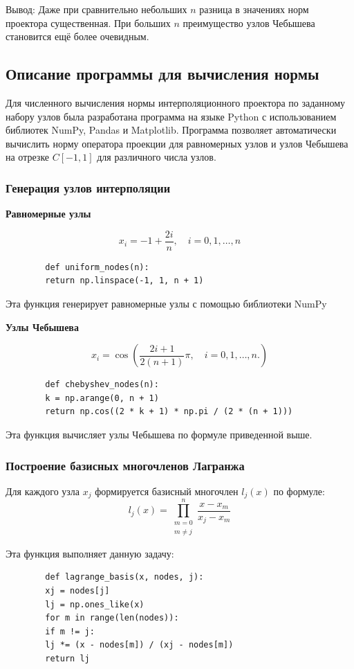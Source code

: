 \documentclass[14pt,openany,a4paper,oneside]{extarticle}
\begin{document}
	Вывод:
	Даже при сравнительно небольших $n$ разница в значениях норм проектора существенная. При больших $n$ преимущество узлов Чебышева становится ещё более очевидным.
	\newpage
	\subsection{Описание программы для вычисления нормы}
	
	Для численного вычисления нормы интерполяционного проектора по заданному набору узлов была разработана программа на языке Python с использованием библиотек NumPy, Pandas и Matplotlib. Программа позволяет автоматически вычислить норму оператора проекции для равномерных узлов и узлов Чебышева на отрезке $C[-1,1]$ для различного числа узлов.
	
	\subsubsection{Генерация узлов интерполяции}
	
	\textbf{Равномерные узлы} 
	
	$$x_i=-1+\frac{2i}{n}, \quad i=0,1,\dots,n$$
	\begin{verbatim}
		def uniform_nodes(n):
		return np.linspace(-1, 1, n + 1)
	\end{verbatim}
	Эта функция генерирует равномерные узлы с помощью библиотеки NumPy 
	
	\textbf{Узлы Чебышева} 
	
	$$x_i = \cos(\frac{2i+1}{2(n+1)}\pi, \quad i=0,1,\dots,n.)$$
	\begin{verbatim}
		def chebyshev_nodes(n):
		k = np.arange(0, n + 1)
		return np.cos((2 * k + 1) * np.pi / (2 * (n + 1)))
	\end{verbatim}
	Эта функция вычисляет узлы Чебышева по формуле приведенной выше.
	
	\subsubsection{Построение базисных многочленов Лагранжа}
	
	Для каждого узла $x_j$ формируется базисный многочлен $l_j(x)$ по формуле:
	$$l_j(x)=\prod^n_{\substack{m=0 \\ m \ne j}}\frac{x-x_m}{x_j-x_m}$$
	
	Эта функция выполняет данную задачу:
	\begin{verbatim}
		def lagrange_basis(x, nodes, j):
		xj = nodes[j]
		lj = np.ones_like(x)
		for m in range(len(nodes)):
		if m != j:
		lj *= (x - nodes[m]) / (xj - nodes[m])
		return lj
	\end{verbatim}
	
\end{document}

